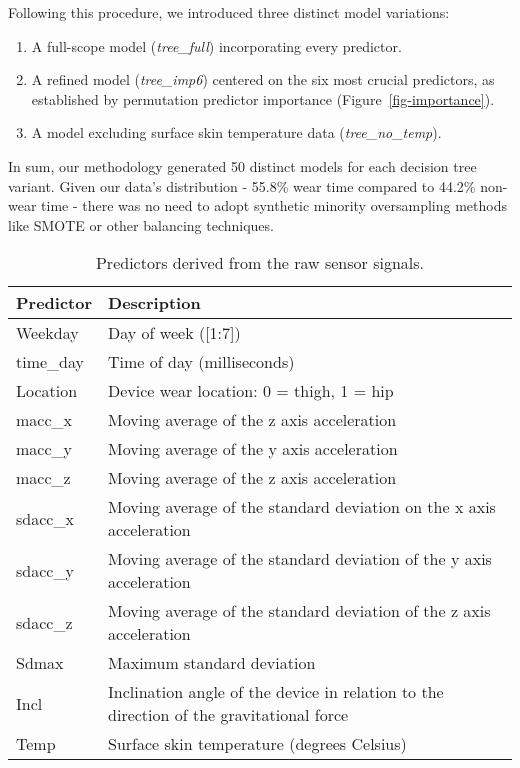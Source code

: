 \documentclass[
  10pt,
]{scrbook}
\begin{document}
Following this procedure, we introduced three distinct model variations:

\begin{enumerate}
\def\labelenumi{\arabic{enumi}.}
\item
  A full-scope model (\emph{tree\_full}) incorporating every predictor.
\item
  A refined model (\emph{tree\_imp6}) centered on the six most crucial
  predictors, as established by permutation predictor importance
  (Figure~\ref{fig-importance}).
\item
  A model excluding surface skin temperature data
  (\emph{tree\_no\_temp}).
\end{enumerate}

In sum, our methodology generated 50 distinct models for each decision
tree variant. Given our data's distribution - 55.8\% wear time compared
to 44.2\% non-wear time - there was no need to adopt synthetic minority
oversampling methods like SMOTE or other balancing techniques.

\begingroup

\footnotesize

\hypertarget{tbl-8}{}
\begin{longtable}{ll}
\caption{\label{tbl-8}Predictors derived from the raw sensor signals. }\tabularnewline

\toprule
Predictor & Description \\ 
\midrule
Weekday & Day of week ([1:7]) \\ 
time\_day & Time of day (milliseconds) \\ 
Location & Device wear location: 0 = thigh, 1 = hip \\ 
macc\_x & Moving average of the z axis acceleration \\ 
macc\_y & Moving average of the y axis acceleration \\ 
macc\_z & Moving average of the z axis acceleration \\ 
sdacc\_x & Moving average of the standard deviation on the x axis acceleration \\ 
sdacc\_y & Moving average of the standard deviation of the y axis acceleration \\ 
sdacc\_z & Moving average of the standard deviation of the z axis acceleration \\ 
Sdmax & Maximum standard deviation \\ 
Incl & Inclination angle of the device in relation to the direction of the gravitational force \\ 
Temp & Surface skin temperature (degrees Celsius) \\ 
\bottomrule
\end{longtable}
\end{document}

